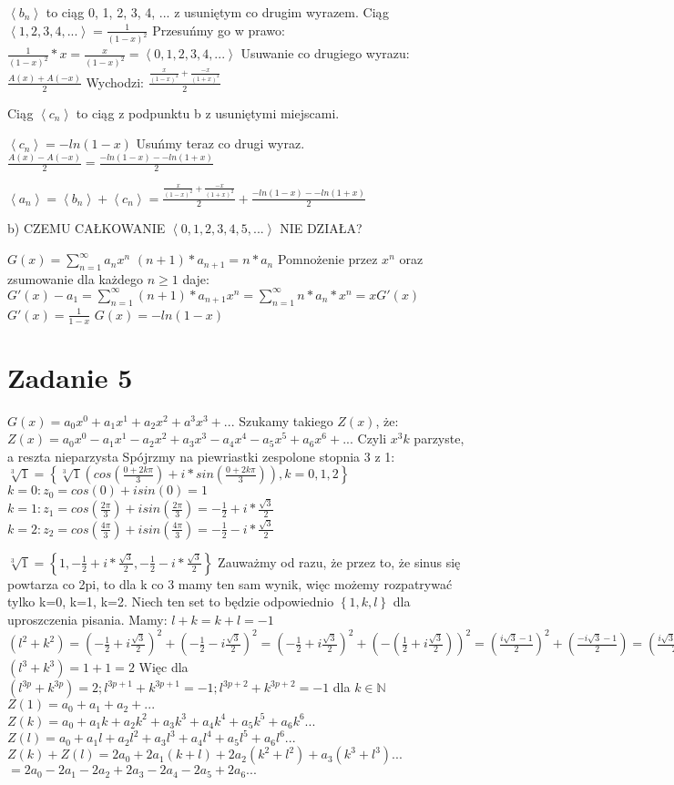 \documentclass[12pt]{article}
\newcommand{\set}[1]{\left \{ #1 \right \}}				%
\newcommand{\sequence}[1]{\left\langle #1 \right\rangle} %
\begin{document}
$\sequence{b_n}$ to ciąg 0, 1, 2, 3, 4, ... z usuniętym co drugim wyrazem.
Ciąg $\sequence{1,2,3,4,...} = \frac{1}{(1-x)^2}$
Przesuńmy go w prawo:
$\frac{1}{(1-x)^2} * x = \frac{x}{(1-x)^2} = \sequence{0, 1, 2, 3, 4, ...}$
Usuwanie co drugiego wyrazu: $\frac{A(x)+A(-x)}{2}$
Wychodzi: $\frac{\frac{x}{(1-x)^2} + \frac{-x}{(1+x)^2}}{2}$

Ciąg $\sequence{c_n}$ to ciąg z podpunktu b z usuniętymi miejscami.

$\sequence{c_n} = -ln(1-x)$
Usuńmy teraz co drugi wyraz.
$\frac{A(x) - A(-x)}{2} = \frac{-ln(1-x) - -ln(1+x)}{2}$

$\sequence{a_n} = \sequence{b_n} + \sequence{c_n} = \frac{\frac{x}{(1-x)^2} + \frac{-x}{(1+x)^2}}{2} + \frac{-ln(1-x) - -ln(1+x)}{2}$

b) 
CZEMU CAŁKOWANIE $\sequence{0, 1, 2, 3, 4, 5, ...}$ NIE DZIAŁA?

$G(x) = \sum_{n=1}^{\infty} a_nx^n$
$(n+1)*a_{n+1} = n*a_n$ 
Pomnożenie przez $x^n$ oraz zsumowanie dla każdego $n \geq 1$ daje:
$G'(x) - a_1 = \sum_{n=1}^{\infty} (n+1)*a_{n+1}x^n = \sum_{n=1}^{\infty} n*a_n*x^n = xG'(x)$
$G'(x) = \frac{1}{1-x}$
$G(x) = -ln(1-x)$


\section{Zadanie 5}
$G(x) = a_0x^0 + a_1x^1 + a_2x^2 + a^3x^3 + ...$
Szukamy takiego $Z(x)$, że:
$Z(x) = a_0x^0 - a_1x^1 - a_2x^2 + a_3x^3 - a_4x^4 - a_5x^5 + a_6x^6 + ...$
Czyli $x^3k$ parzyste, a reszta nieparzysta
Spójrzmy na piewriastki zespolone stopnia 3 z 1:
$\sqrt[3]{1} = \set{\sqrt[3]{1}(cos(\frac{0+2k\pi}{3}) + i*sin(\frac{0+2k\pi}{3})), k={0,1,2}}$
$k=0: z_0 = cos(0) + isin(0) = 1$
$k=1: z_1 = cos(\frac{2\pi}{3}) + isin(\frac{2\pi}{3}) = -\frac{1}{2}+i*\frac{\sqrt{3}}{2}$
$k=2: z_2 = cos(\frac{4\pi}{3}) + isin(\frac{4\pi}{3}) = -\frac{1}{2}-i*\frac{\sqrt{3}}{2}$

$\sqrt[3]{1} = \set{1, -\frac{1}{2}+i*\frac{\sqrt{3}}{2}, -\frac{1}{2}-i*\frac{\sqrt{3}}{2}}$
Zauważmy od razu, że przez to, że sinus się powtarza co 2pi, to dla k co 3 mamy ten sam wynik, więc możemy rozpatrywać tylko k=0, k=1, k=2.
Niech ten set to będzie odpowiednio $\set{1, k, l}$ dla uproszczenia pisania. Mamy:
$l + k = k + l = -1$
$(l^2+k^2) = (-\frac{1}{2}+i\frac{\sqrt{3}}{2})^2 + (-\frac{1}{2}-i\frac{\sqrt{3}}{2})^2 = (-\frac{1}{2}+i\frac{\sqrt{3}}{2})^2 + (-(\frac{1}{2}+i\frac{\sqrt{3}}{2}))^2 = (\frac{i\sqrt{3}-1}{2})^2 + (\frac{-i\sqrt{3}-1}{2}) = (\frac{i\sqrt{3}-1}{2})^2 + (\frac{-1(i\sqrt{3}+1)}{2}) = \frac{-2i\sqrt{3}-2}{4} + \frac{1 * (2i\sqrt{3}-2)}{4} = \frac{-4}{4} = -1$
$(l^3+k^3) = 1 + 1 = 2$
Więc dla $(l^{3p}+k^{3p}) = 2; l^{3p+1}+k^{3p+1} = -1; l^{3p+2}+k^{3p+2}=-1$ dla $k \in \mathbb{N}$
$Z(1) = a_0 + a_1 + a_2 + ... $
$Z(k) = a_0 + a_1k + a_2k^2 + a_3k^3 + a_4k^4 + a_5k^5 + a_6k^6 ...$
$Z(l) = a_0 + a_1l + a_2l^2 + a_3l^3 + a_4l^4 + a_5l^5 + a_6l^6 ...$
$Z(k) + Z(l) = 2a_0 + 2a_1(k+l) + 2a_2(k^2+l^2) + a_3(k^3+l^3) ...$
$= 2a_0 - 2a_1 - 2a_2 + 2a_3 - 2a_4 - 2a_5 + 2a_6 ...$
\end{document}
